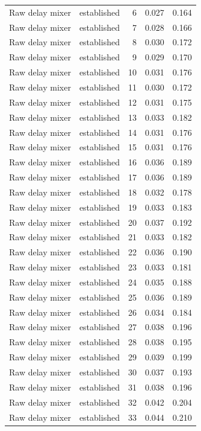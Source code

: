\begin{tabular}{llrrr}
Raw delay mixer & established & 6 & 0.027 & 0.164 \\
Raw delay mixer & established & 7 & 0.028 & 0.166 \\
Raw delay mixer & established & 8 & 0.030 & 0.172 \\
Raw delay mixer & established & 9 & 0.029 & 0.170 \\
Raw delay mixer & established & 10 & 0.031 & 0.176 \\
Raw delay mixer & established & 11 & 0.030 & 0.172 \\
Raw delay mixer & established & 12 & 0.031 & 0.175 \\
Raw delay mixer & established & 13 & 0.033 & 0.182 \\
Raw delay mixer & established & 14 & 0.031 & 0.176 \\
Raw delay mixer & established & 15 & 0.031 & 0.176 \\
Raw delay mixer & established & 16 & 0.036 & 0.189 \\
Raw delay mixer & established & 17 & 0.036 & 0.189 \\
Raw delay mixer & established & 18 & 0.032 & 0.178 \\
Raw delay mixer & established & 19 & 0.033 & 0.183 \\
Raw delay mixer & established & 20 & 0.037 & 0.192 \\
Raw delay mixer & established & 21 & 0.033 & 0.182 \\
Raw delay mixer & established & 22 & 0.036 & 0.190 \\
Raw delay mixer & established & 23 & 0.033 & 0.181 \\
Raw delay mixer & established & 24 & 0.035 & 0.188 \\
Raw delay mixer & established & 25 & 0.036 & 0.189 \\
Raw delay mixer & established & 26 & 0.034 & 0.184 \\
Raw delay mixer & established & 27 & 0.038 & 0.196 \\
Raw delay mixer & established & 28 & 0.038 & 0.195 \\
Raw delay mixer & established & 29 & 0.039 & 0.199 \\
Raw delay mixer & established & 30 & 0.037 & 0.193 \\
Raw delay mixer & established & 31 & 0.038 & 0.196 \\
Raw delay mixer & established & 32 & 0.042 & 0.204 \\
Raw delay mixer & established & 33 & 0.044 & 0.210 \\

\end{tabular}
